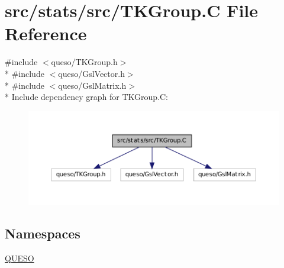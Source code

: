 \hypertarget{_t_k_group_8_c}{\section{src/stats/src/\-T\-K\-Group.C File Reference}
\label{_t_k_group_8_c}
}
{\ttfamily \#include $<$queso/\-T\-K\-Group.\-h$>$}\\*
{\ttfamily \#include $<$queso/\-Gsl\-Vector.\-h$>$}\\*
{\ttfamily \#include $<$queso/\-Gsl\-Matrix.\-h$>$}\\*
Include dependency graph for T\-K\-Group.\-C\-:
\nopagebreak
\begin{figure}[H]
\begin{center}
\leavevmode
\includegraphics[width=350pt]{_t_k_group_8_c__incl}
\end{center}
\end{figure}
\subsection*{Namespaces}
\begin{DoxyCompactItemize}
\item 
\hyperlink{namespace_q_u_e_s_o}{Q\-U\-E\-S\-O}
\end{DoxyCompactItemize}

